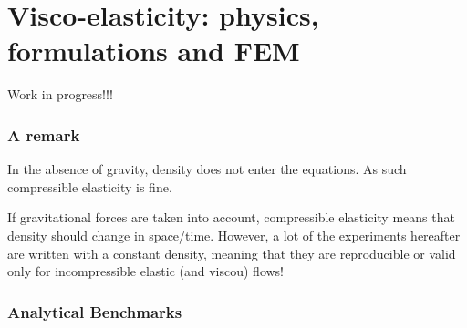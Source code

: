 \chapter{Visco-elasticity: physics, formulations and FEM } %


{\Large Work in progress!!!}

\subsection{A remark}

In the absence of gravity, density does not enter the equations. 
As such compressible elasticity is fine. 

If gravitational forces are taken into account, compressible elasticity
means that density should change in space/time. However, 
a lot of the experiments hereafter are written with a constant density, 
meaning that they are reproducible or valid only for incompressible elastic (and viscou) flows!

\subsection{Analytical Benchmarks}

